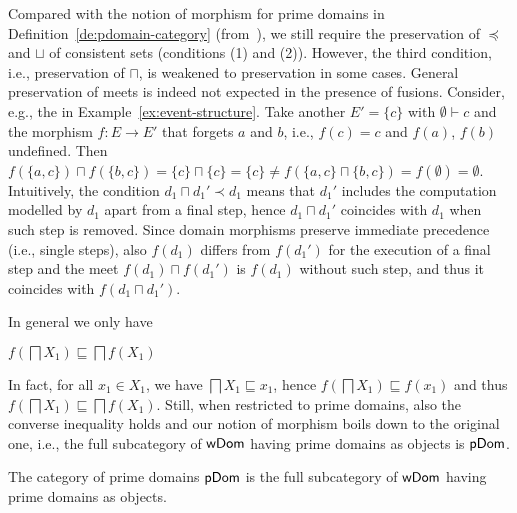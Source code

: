 Compared with the notion of morphism for prime domains in
Definition~\ref{de:pdomain-category} (from~\cite{Win:ES}), we still
require the preservation of $\preceq$ and $\sqcup$ of consistent sets
(conditions (1) and (2)). However, the third condition, i.e.,
preservation of $\sqcap$, is weakened to preservation in some
cases. General preservation of meets is indeed not expected in the
presence of fusions. Consider, e.g., the {\esabbr} in
Example~\ref{ex:event-structure}. Take another {\esabbr} $E' = \{c \}$
with $\emptyset \vdash c$ and the morphism $f : E \to E'$ that forgets
$a$ and $b$, i.e., $f(c) = c$ and $f(a)$, $f(b)$ undefined.
%
Then $f(\{a,c\}) \sqcap f(\{b,c\}) = \{c\} \sqcap \{c\} = \{ c \} \neq
f(\{a,c\} \sqcap \{b,c\}) = f(\emptyset) = \emptyset$. 
%
Intuitively, the condition $d_1 \sqcap d_1' \prec d_1$ means that
$d_1'$ includes the computation modelled by $d_1$ apart from a final
step, hence $d_1 \sqcap d_1'$ coincides with $d_1$ when such step is
removed. Since domain morphisms preserve immediate precedence (i.e.,
single steps), also $f(d_1)$ differs from $f(d_1')$ for the
execution of a final step and the meet $f(d_1) \sqcap f(d_1')$ is
$f(d_1)$ without such step, and thus it coincides with
$f(d_1 \sqcap d_1')$.

In general we only have
\begin{center}
  $f(\bigsqcap X_1) \sqsubseteq \bigsqcap f(X_1)$
\end{center}
% 
In fact, for all $x_1 \in X_1$, we have
$\bigsqcap X_1 \sqsubseteq x_1$, hence
$f(\bigsqcap X_1) \sqsubseteq f(x_1)$ and thus
$f(\bigsqcap X_1) \sqsubseteq \bigsqcap f(X_1)$.
%
Still, when restricted to prime domains, also the converse inequality
holds and our notion of morphism boils down to the original one, i.e.,
the full subcategory of $\mathsf{wDom}$ having prime domains as objects is
$\mathsf{pDom}$.



\begin{theorem}
    \label{th:PdomFullSub}
  The category of prime domains $\mathsf{pDom}$ is the full
  subcategory of $\mathsf{wDom}$ having prime domains as objects.
\end{theorem}


